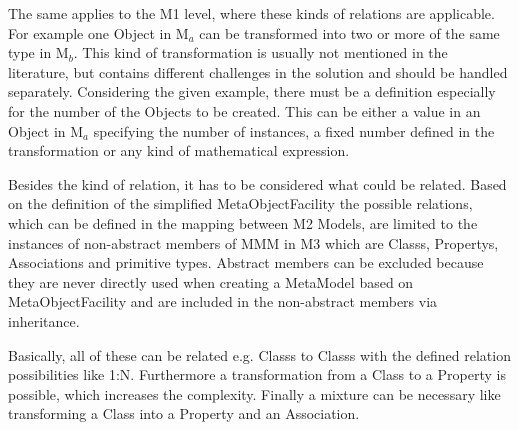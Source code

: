 The same applies to the M1 level, where these kinds of relations are applicable. For example one \gls{Object} in M$_a$ can be transformed into two or more of the same type in M$_b$. This kind of transformation is usually not mentioned in the literature, but contains different challenges in the solution and should be handled separately. Considering the given example, there must be a definition especially for the number of the \glspl{Object} to be created. This can be either a value in an \gls{Object} in M$_a$ specifying the number of instances, a fixed number defined in the transformation or any kind of mathematical expression.

Besides the kind of relation, it has to be considered what could be related. Based on the definition of the simplified \gls{MetaObjectFacility} the possible relations, which can be defined in the mapping between M2 \glspl{Model}, are limited to the instances of non-abstract members of MMM in M3 which are \glspl{Class}, \glspl{Property}, \glspl{Association} and primitive types. Abstract members can be excluded because they are never directly used when creating a \gls{MetaModel} based on \gls{MetaObjectFacility} and are included in the non-abstract members via inheritance.

Basically, all of these can be related e.g. \glspl{Class} to \glspl{Class} with the defined relation possibilities like 1:N. Furthermore a transformation from a \gls{Class} to a \gls{Property} is possible, which increases the complexity. Finally a mixture can be necessary like transforming a \gls{Class} into a \gls{Property} and an \gls{Association}.


%

%
%
%

%
%


